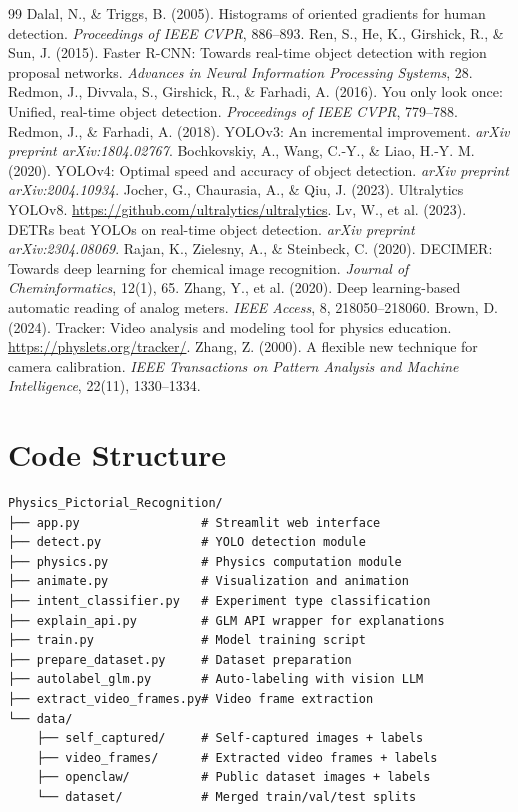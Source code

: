 \documentclass[12pt]{article}
\begin{document}
\newpage
\begin{thebibliography}{99}
   Dalal, N., \& Triggs, B. (2005). Histograms of oriented gradients for human detection. \textit{Proceedings of IEEE CVPR}, 886--893.
   Ren, S., He, K., Girshick, R., \& Sun, J. (2015). Faster R-CNN: Towards real-time object detection with region proposal networks. \textit{Advances in Neural Information Processing Systems}, 28.
   Redmon, J., Divvala, S., Girshick, R., \& Farhadi, A. (2016). You only look once: Unified, real-time object detection. \textit{Proceedings of IEEE CVPR}, 779--788.
   Redmon, J., \& Farhadi, A. (2018). YOLOv3: An incremental improvement. \textit{arXiv preprint arXiv:1804.02767}.
   Bochkovskiy, A., Wang, C.-Y., \& Liao, H.-Y. M. (2020). YOLOv4: Optimal speed and accuracy of object detection. \textit{arXiv preprint arXiv:2004.10934}.
   Jocher, G., Chaurasia, A., \& Qiu, J. (2023). Ultralytics YOLOv8. \url{https://github.com/ultralytics/ultralytics}.
   Lv, W., et al. (2023). DETRs beat YOLOs on real-time object detection. \textit{arXiv preprint arXiv:2304.08069}.
   Rajan, K., Zielesny, A., \& Steinbeck, C. (2020). DECIMER: Towards deep learning for chemical image recognition. \textit{Journal of Cheminformatics}, 12(1), 65.
   Zhang, Y., et al. (2020). Deep learning-based automatic reading of analog meters. \textit{IEEE Access}, 8, 218050--218060.
   Brown, D. (2024). Tracker: Video analysis and modeling tool for physics education. \url{https://physlets.org/tracker/}.
   Zhang, Z. (2000). A flexible new technique for camera calibration. \textit{IEEE Transactions on Pattern Analysis and Machine Intelligence}, 22(11), 1330--1334.
\end{thebibliography}

\newpage
\appendix
\section{Code Structure}

\begin{verbatim}
Physics_Pictorial_Recognition/
├── app.py                 # Streamlit web interface
├── detect.py              # YOLO detection module
├── physics.py             # Physics computation module
├── animate.py             # Visualization and animation
├── intent_classifier.py   # Experiment type classification
├── explain_api.py         # GLM API wrapper for explanations
├── train.py               # Model training script
├── prepare_dataset.py     # Dataset preparation
├── autolabel_glm.py       # Auto-labeling with vision LLM
├── extract_video_frames.py# Video frame extraction
└── data/
    ├── self_captured/     # Self-captured images + labels
    ├── video_frames/      # Extracted video frames + labels
    ├── openclaw/          # Public dataset images + labels
    └── dataset/           # Merged train/val/test splits
\end{verbatim}
\end{document}
